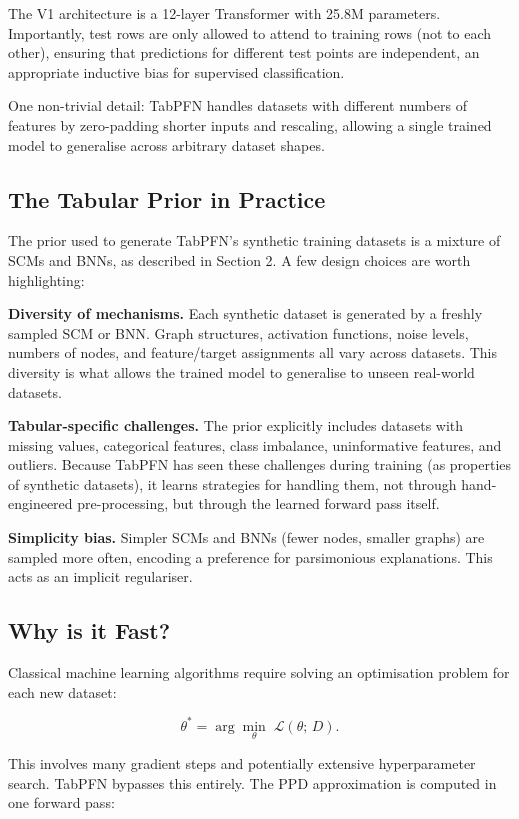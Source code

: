 \documentclass[12pt]{article}
\begin{document}
The V1 architecture is a 12-layer Transformer with 25.8M parameters. Importantly, test rows are only allowed to attend to training rows (not to each other), ensuring that predictions for different test points are independent,  an appropriate inductive bias for supervised classification.

One non-trivial detail: TabPFN handles datasets with different numbers of features by zero-padding shorter inputs and rescaling, allowing a single trained model to generalise across arbitrary dataset shapes.

\subsection{The Tabular Prior in Practice}

The prior used to generate TabPFN's synthetic training datasets is a mixture of SCMs and BNNs, as described in Section 2. A few design choices are worth highlighting:

\textbf{Diversity of mechanisms.} Each synthetic dataset is generated by a freshly sampled SCM or BNN. Graph structures, activation functions, noise levels, numbers of nodes, and feature/target assignments all vary across datasets. This diversity is what allows the trained model to generalise to unseen real-world datasets.

\textbf{Tabular-specific challenges.} The prior explicitly includes datasets with missing values, categorical features, class imbalance, uninformative features, and outliers. Because TabPFN has seen these challenges during training (as properties of synthetic datasets), it learns strategies for handling them,  not through hand-engineered pre-processing, but through the learned forward pass itself.

\textbf{Simplicity bias.} Simpler SCMs and BNNs (fewer nodes, smaller graphs) are sampled more often, encoding a preference for parsimonious explanations. This acts as an implicit regulariser.

\subsection{Why is it Fast?}

Classical machine learning algorithms require solving an optimisation problem for each new dataset:

\[
\theta^* = \arg\min_\theta\; \mathcal{L}(\theta;\, D).
\]

This involves many gradient steps and potentially extensive hyperparameter search. TabPFN bypasses this entirely. The PPD approximation is computed in one forward pass:
\end{document}
